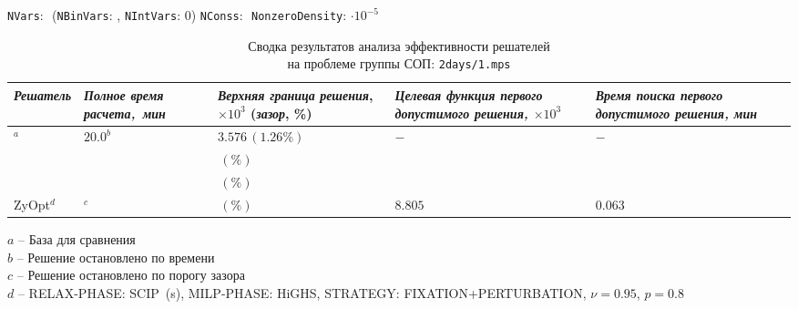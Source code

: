 \documentclass[%
	11pt,
	a4paper,
	utf8,
		]{article}
\begin{document}
\vspace*{5mm}

{
	\begin{table}[!h]
		\centering
		\caption{Сводка результатов анализа эффективности решателей\\ на проблеме группы СОП: \texttt{2days/1.mps}} 
		
		{\footnotesize \texttt{NVars}: $  $ (\texttt{NBinVars}: $  $,  \texttt{NIntVars}: $ 0 $) \texttt{NConss}: $ $ \texttt{NonzeroDensity}: $  \cdot 10^{-5} $}\\[2mm]
		
		\begin{tabular}{ p{2.9cm} | p{2.5cm} p{3.4cm} p{3.75cm} p{3.6cm} p{3.2cm} }
			\rowcolor{black!5}\emph{Решатель} & \emph{Полное время \mbox{расчета, мин}} & \emph{Верхняя граница} \mbox{\itshape решения}, $ \times 10^{3} $ (\emph{зазор}, \%) & \emph{Целевая функция первого допустимого решения, $ \times 10^3 $} & \emph{Время поиска первого допустимого решения, мин} \\
			\hline
			\rowcolor{blue!3}{CPLEX 12.8.0.0}$ ^a $ & $ 20.0^b $ & $ 3.576 \, (1.26\%) $ & $ - $ & $ - $ \\
			\rowcolor{black!5}{SCIP 8.0.3} & $ $ & $  \, (\%) $ & $  $ &  \\
			\rowcolor{blue!3}{HiGHS 1.5.3} & $  $ & $  \, (\%)$ & $  $ & $  $ \\
			\rowcolor{black!3}ZyOpt$^d$ & {$ ^c $}  & $  \, (\%) $ & $ 8.805 $ & $ 0.063 $ \\
		\end{tabular}
	\end{table}
	\vspace*{-3mm}
	\hspace*{3mm}$ a $ -- {\footnotesize База для сравнения}\\[-7mm]
	
	\hspace*{3mm}$ b $ -- {\footnotesize Решение остановлено по времени}\\[-7mm]
	
	\hspace*{3mm}$ c $ -- {\footnotesize Решение остановлено по порогу зазора}\\[-7mm]
	
	\hspace*{3mm}$ d $ -- {\footnotesize RELAX-PHASE: SCIP~(s), MILP-PHASE: HiGHS, STRATEGY: FIXATION+PERTURBATION, $ \nu = 0.95 $, $ p = 0.8 $}\\[-7mm]
}
\end{document}
